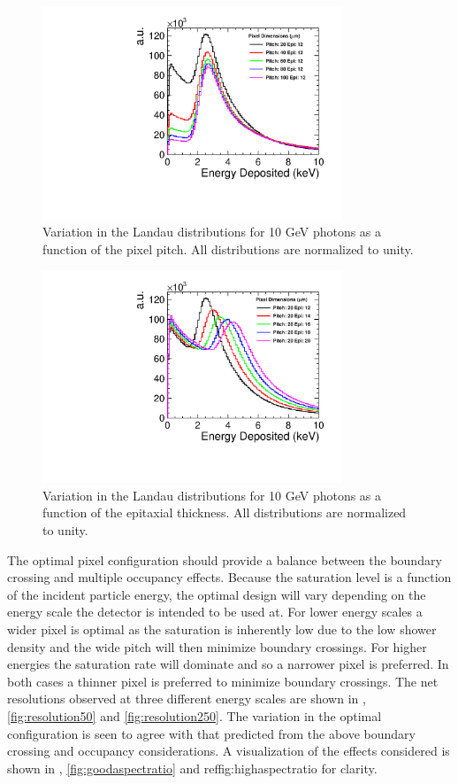 \begin{figure}
  \centering
  \includegraphics[width=0.8\textwidth,keepaspectratio]{DECALStudies/fig/LandauVsPitch.pdf}
  \caption{Variation in the Landau distributions for 10 GeV photons as a function of the pixel pitch. All distributions are normalized to unity.}
  \label{fig:Landaupitches}
\end{figure}
\begin{figure}
  \centering
  \includegraphics[width=0.8\textwidth,keepaspectratio]{DECALStudies/fig/LandauVsEpi.pdf}
  \caption{Variation in the Landau distributions for 10 GeV photons as a function of the epitaxial thickness. All distributions are normalized to unity.}
  \label{fig:Landauthickness}
\end{figure}

The optimal pixel configuration should provide a balance between the boundary crossing and multiple occupancy effects. Because the saturation level is a function of the incident particle energy, the optimal design will vary depending on the energy scale the detector is intended to be used at. For lower energy scales a wider pixel is optimal as the saturation is inherently low due to the low shower density and the wide pitch will then minimize boundary crossings. For higher energies the saturation rate will dominate and so a narrower pixel is preferred. In both cases a thinner pixel is preferred to minimize boundary crossings. The net resolutions observed at three different energy scales are shown in , \ref{fig:resolution50} and \ref{fig:resolution250}. The variation in the optimal configuration is seen to agree with that predicted from the above boundary crossing and occupancy considerations. A visualization of the effects considered is shown in , \ref{fig:goodaspectratio} and ref{fig:highaspectratio} for clarity.

